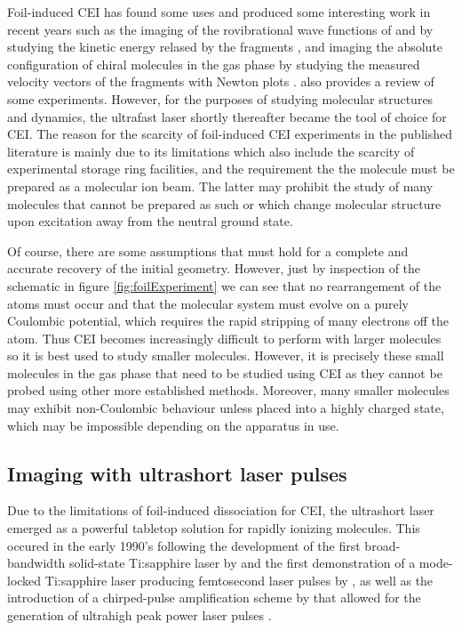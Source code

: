 Foil-induced CEI has found some uses and produced some interesting work in 
recent years such as the imaging of the rovibrational wave functions of  and  by studying the kinetic energy relased by the fragments \citep{Jordon-Thaden11, Herwig13PRA}, and imaging the absolute configuration of chiral molecules in the gas phase by studying the measured velocity vectors of the fragments with Newton plots \citep{Herwig13}. \citet{Vager01} also provides a review of some experiments. However, for the purposes of studying molecular structures and dynamics, the ultrafast laser shortly thereafter became the tool of choice for CEI. The reason for the scarcity of foil-induced CEI experiments in the published literature is mainly due to its limitations which also include the scarcity of experimental storage ring facilities, and the requirement the the molecule must be prepared as a molecular ion beam. The latter may prohibit the study of many molecules that cannot be prepared as such or which change molecular structure upon excitation away from the neutral ground state.

Of course, there are some assumptions that must hold for a complete and accurate recovery of the initial geometry. However, just by inspection of the schematic in figure \ref{fig:foilExperiment} we can see that no rearrangement of the atoms must occur and that the molecular system must evolve on a purely Coulombic potential, which requires the rapid stripping of many electrons off the atom. Thus CEI becomes increasingly difficult to perform with larger molecules so it is best used to study smaller molecules. However, it is precisely these small molecules in the gas phase that need to be studied using CEI as they cannot be probed using other more established methods. Moreover, many smaller molecules may exhibit non-Coulombic behaviour unless placed into a highly charged state, which may be impossible depending on the apparatus in use.

\subsection{Imaging with ultrashort laser pulses}\label{sec:laserCEI}
Due to the limitations of foil-induced dissociation for CEI, the ultrashort laser emerged as a powerful tabletop solution for rapidly ionizing molecules. This occured in the early 1990's following the development of the first broad-bandwidth solid-state Ti:sapphire laser by \citet{Moulton86} and the first demonstration of a mode-locked Ti:sapphire laser producing femtosecond laser pulses by \citet{Spence91}, as well as the introduction of a chirped-pulse amplification scheme by \citet{Strickland85} that allowed for the generation of ultrahigh peak power laser pulses \citep{Maine88}.

